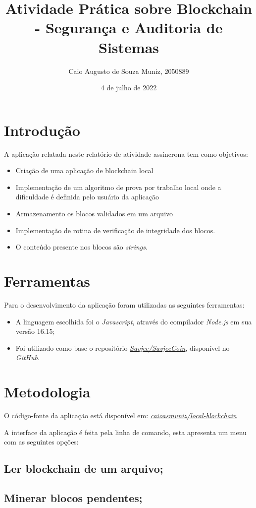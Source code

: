 \documentclass{article}
\title{Atividade Prática sobre Blockchain - Segurança e Auditoria de Sistemas}
\author{Caio Augusto de Souza Muniz, 2050889}
\date{4 de julho de 2022}
\begin{document}
\maketitle

\section{Introdução}
A aplicação relatada neste relatório de atividade assíncrona tem como objetivos:
\begin{itemize}
\item Criação de uma aplicação de blockchain local
\item Implementação de um algoritmo de prova por trabalho local onde a dificuldade é definida pelo usuário da aplicação
\item Armazenamento os blocos validados em um arquivo
\item Implementação de rotina de verificação de integridade dos blocos.
\item O conteúdo presente nos blocos são \textit{strings}.
\end{itemize}
\section{Ferramentas}
Para o desenvolvimento da aplicação foram utilizadas as seguintes ferramentas:
\begin{itemize}
\item A linguagem escolhida foi o \textit{Javascript}, através do compilador \textit{Node.js} em sua versão 16.15;
\item Foi utilizado como base o repositório \href{https://github.com/Savjee/SavjeeCoin}{\textit{Savjee/SavjeeCoin}}, disponível no \textit{GitHub}.
\end{itemize}
\section{Metodologia}
O código-fonte da aplicação está disponível em: \href{https://github.com/caioasmuniz/local-blockchain}{\textit{caioasmuniz/local-blockchain}}

A interface da aplicação é feita pela linha de comando, esta apresenta um menu com as seguintes opções:
\subsection{Ler blockchain de um arquivo;}
\subsection{Minerar blocos pendentes;}
\end{document}
